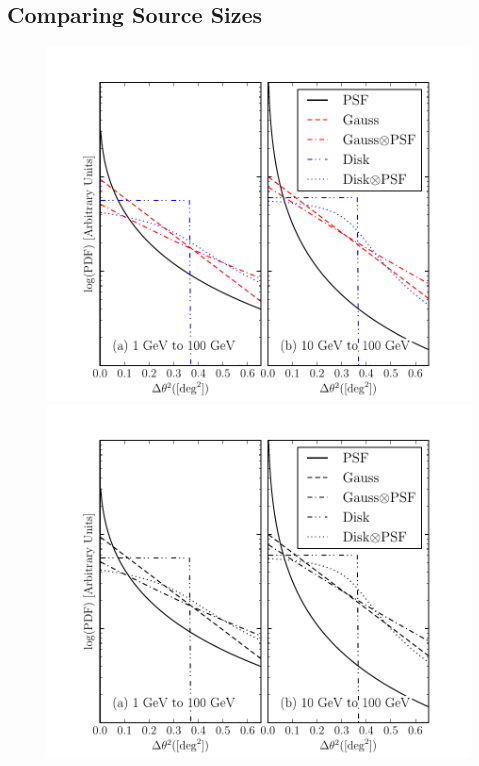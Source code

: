 \subsection{Comparing Source Sizes}


\clearpage
\begin{figure}
    \ifcolorfigure
      \includegraphics{mc_plots/compare_disk_gauss_color.pdf}
    \else
      \includegraphics{mc_plots/compare_disk_gauss_bw.pdf}
    \fi

\end{figure}
